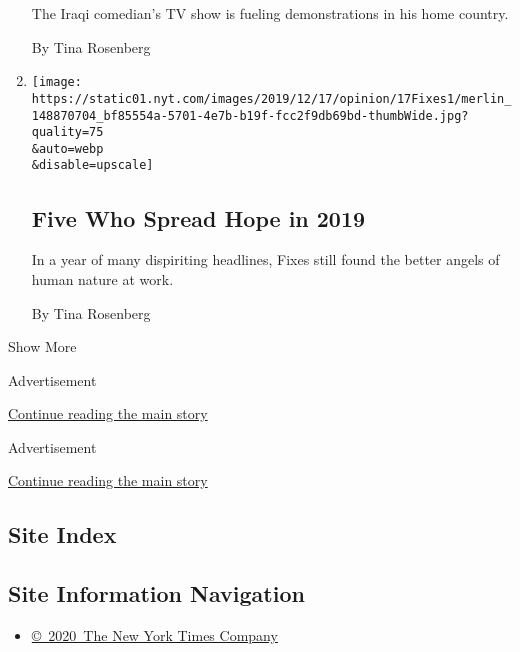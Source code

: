 \begin{enumerate}
  The Iraqi comedian's TV show is fueling demonstrations in his home
  country.

  By Tina Rosenberg
\item
  \href{/2019/12/17/opinion/spread-hope-2019.html}{}

  \texttt{[image: https://static01.nyt.com/images/2019/12/17/opinion/17Fixes1/merlin\_148870704\_bf85554a-5701-4e7b-b19f-fcc2f9db69bd-thumbWide.jpg?quality=75\\\&auto=webp\\\&disable=upscale]}

  \hypertarget{five-who-spread-hope-in-2019}{%
  \subsection{Five Who Spread Hope in
  2019}\label{five-who-spread-hope-in-2019}}

  In a year of many dispiriting headlines, Fixes still found the better
  angels of human nature at work.

  By Tina Rosenberg
\end{enumerate}

Show More

Advertisement

\protect\hyperlink{after-mid1}{Continue reading the main story}

Advertisement

\protect\hyperlink{after-mktg}{Continue reading the main story}

\hypertarget{site-index}{%
\subsection{Site Index}\label{site-index}}

\hypertarget{site-information-navigation}{%
\subsection{Site Information
Navigation}\label{site-information-navigation}}

\begin{itemize}
\tightlist
\item
  \href{https://help.nytimes.com/hc/en-us/articles/115014792127-Copyright-notice}{©~2020~The
  New York Times Company}
\end{itemize}

